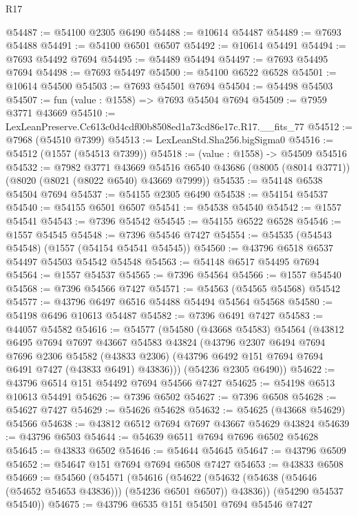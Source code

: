 \begin{lexlean}{R17}
\begin{coremodule}
@54487 := @54100 @2305 @6490
@54488 := @10614 @54487
@54489 := @7693 @54488
@54491 := @54100 @6501 @6507
@54492 := @10614 @54491
@54494 := @7693 @54492 @7694
@54495 := @54489 @54494
@54497 := @7693 @54495 @7694
@54498 := @7693 @54497
@54500 := @54100 @6522 @6528
@54501 := @10614 @54500
@54503 := @7693 @54501 @7694
@54504 := @54498 @54503
@54507 := fun (value : @1558) => @7693 @54504 @7694
@54509 := @7959 @3771 @43669
@54510 := LexLeanPreserve.Cc613c0d4cdf00b8508ed1a73cd86e17c.R17.__fits_77
@54512 := @7968 (@54510 @7399)
@54513 := LexLeanStd.Sha256.bigSigma0
@54516 := @54512 (@1557 (@54513 @7399))
@54518 := (value : @1558) -> @54509 @54516
@54532 := @7982
    @3771
    @43669
    @54516
    @6540
    @43686
    (@8005 (@8014 @3771))
    (@8020 (@8021 (@8022 @6540) @43669 @7999))
@54535 := @54148 @6538 @54504 @7694
@54537 := @54155 @2305 @6490
@54538 := @54154 @54537
@54540 := @54155 @6501 @6507
@54541 := @54538 @54540
@54542 := @1557 @54541
@54543 := @7396 @54542
@54545 := @54155 @6522 @6528
@54546 := @1557 @54545
@54548 := @7396 @54546 @7427
@54554 := @54535 (@54543 @54548) (@1557 (@54154 @54541 @54545))
@54560 := @43796 @6518 @6537 @54497 @54503 @54542 @54548
@54563 := @54148 @6517 @54495 @7694
@54564 := @1557 @54537
@54565 := @7396 @54564
@54566 := @1557 @54540
@54568 := @7396 @54566 @7427
@54571 := @54563 (@54565 @54568) @54542
@54577 := @43796 @6497 @6516 @54488 @54494 @54564 @54568
@54580 := @54198 @6496 @10613 @54487
@54582 := @7396 @6491 @7427
@54583 := @44057 @54582
@54616 := @54577
    (@54580
      (@43668 @54583)
      @54564
      (@43812
        @6495
        @7694
        @7697
        @43667
        @54583
        @43824
        (@43796
          @2307
          @6494
          @7694
          @7696
          @2306
          @54582
          (@43833 @2306)
          (@43796 @6492 @151 @7694 @7694 @6491 @7427 (@43833 @6491) @43836)))
      (@54236 @2305 @6490))
@54622 := @43796 @6514 @151 @54492 @7694 @54566 @7427
@54625 := @54198 @6513 @10613 @54491
@54626 := @7396 @6502
@54627 := @7396 @6508
@54628 := @54627 @7427
@54629 := @54626 @54628
@54632 := @54625 (@43668 @54629) @54566
@54638 := @43812 @6512 @7694 @7697 @43667 @54629 @43824
@54639 := @43796 @6503
@54644 := @54639 @6511 @7694 @7696 @6502 @54628
@54645 := @43833 @6502
@54646 := @54644 @54645
@54647 := @43796 @6509
@54652 := @54647 @151 @7694 @7694 @6508 @7427
@54653 := @43833 @6508
@54669 := @54560
    (@54571
      (@54616
        (@54622 (@54632 (@54638 (@54646 (@54652 @54653 @43836))) (@54236 @6501 @6507)) @43836))
      (@54290 @54537 @54540))
@54675 := @43796 @6535 @151 @54501 @7694 @54546 @7427

\end{coremodule}
\end{lexlean}
